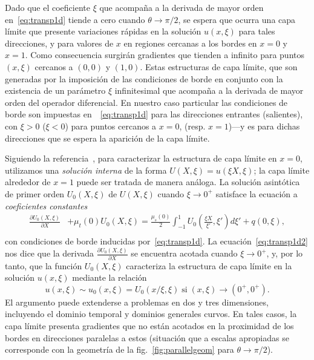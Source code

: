 Dado que el coeficiente $\xi$ que acompaña a la derivada de mayor 
orden en~\eqref{eq:transp1d} tiende a cero cuando $\theta \to \pi/2$, 
se espera que ocurra una capa límite que presente variaciones rápidas 
en la solución $u(x,\xi)$ para tales direcciones, y para valores 
de $x$ en regiones cercanas a los bordes en $x=0$ y $x=1$.
Como consecuencia surgirán gradientes que 
tienden a infinito para puntos $(x,\xi)$ cercanos a $(0,0)$ y $(1,0)$. 
Estas estructuras de capa límite, que son generadas por 
la imposición de las condiciones de borde en conjunto con la existencia 
de un parámetro $\xi$ infinitesimal que acompaña a la derivada de mayor 
orden del operador diferencial. En nuestro caso particular 
las condiciones de borde son impuestas en~~\eqref{eq:transp1d} para las direcciones 
entrantes (salientes), con $\xi>0$ ($\xi<0$) para puntos cercanos 
a $x=0$, (resp. $x=1$)---y es para dichas direcciones que 
se espera la aparición de la capa límite.

Siguiendo la referencia~\cite{Bender1999}, para caracterizar
la estructura de capa límite en \eg $x=0$, utilizamos una 
{\em solución interna} de la forma $U(X,\xi) = u(\xi X,\xi)$; 
la capa límite alrededor de $x=1$ puede ser tratada de manera 
análoga. La solución asintótica de primer orden $U_0(X,\xi)$ 
de $U(X,\xi)$ cuando $\xi\to 0^+$ satisface la ecuación 
a {\em coeficientes constantes} 
\begin{equation}
\begin{split}
\frac{\partial U_0(X,\xi)}{\partial X}& + \mu_t(0) U_0(X,\xi)=\frac{\mu_s(0)}{2} 
\int_{-1}^{1} U_0\left(\frac{\xi X}{\xi'},\xi'\right) d\xi' +q(0,\xi),\\
\end{split}
\label{eq:transp1d2}
\end{equation}
con condiciones de borde inducidas por~\eqref{eq:transp1d}. 
La ecuación~\eqref{eq:transp1d2} nos dice que la derivada 
$\frac{\partial U_0(X,\xi)}{\partial X}$ se encuentra 
acotada cuando $\xi\to 0^+$, y, por lo tanto, que la función 
$U_0(X,\xi)$ caracteriza la estructura de capa límite 
en la solución $u(x,\xi)$ mediante la relación 
\begin{equation}
  u(x,\xi)\sim u_0(x,\xi) = U_0(x/\xi,\xi) \; \text{si}  \;  (x,\xi)\to (0^+,0^+).
\end{equation}
El argumento puede extenderse a problemas en dos y tres dimensiones, 
incluyendo el dominio temporal y dominios generales curvos. En tales casos, 
la capa límite presenta gradientes que no están acotados 
en la proximidad de los bordes en direcciones paralelas a estos 
(situación que a escalas apropiadas se corresponde con la geometría 
de la fig.~\ref{fig:parallelgeom} para $\theta \to \pi/2$). 

